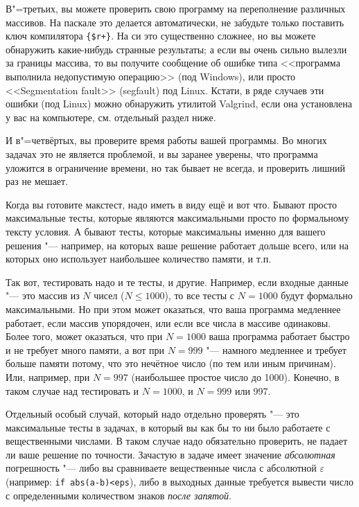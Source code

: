 В"=третьих, вы можете проверить свою программу на переполнение различных массивов. 
На паскале это делается автоматически, не забудьте только поставить ключ компилятора \verb`{$r+}`.
На си это существенно сложнее, но вы можете обнаружить какие-нибудь странные результаты;
а если вы очень сильно вылезли за границы массива, то вы получите сообщение об ошибке типа <<программа выполнила недопустимую операцию>> (под Windows),
или просто <<Segmentation fault>> (segfault) под Linux. 
Кстати, в ряде случаев эти ошибки (под Linux) можно обнаружить утилитой Valgrind, если она установлена у вас на компьютере, см. отдельный раздел ниже.

И в"=четвёртых, вы проверите время работы вашей программы. 
Во многих задачах это не является проблемой, и вы заранее уверены, что программа уложится в ограничение времени, 
но так бывает не всегда, и проверить лишний раз не мешает.

Когда вы готовите макстест, надо иметь в виду ещё и вот что. 
Бывают просто максимальные тесты, которые являются максимальными просто по формальному тексту условия.
А бывают тесты, которые максимальны именно для вашего решения "--- например, на которых ваше решение работает дольше всего,
или на которых оно использует наибольшее количество памяти, и т.п.

Так вот, тестировать надо и те тесты, и другие. 
Например, если входные данные "--- это массив из $N$ чисел ($N\leq 1000$), то все тесты с $N=1000$ будут формально максимальными.
Но при этом может оказаться, что ваша программа медленнее работает, если массив упорядочен, или если все числа в массиве одинаковы.
Более того, может оказаться, что при $N=1000$ ваша программа работает быстро и не требует много памяти, а вот при $N=999$ "--- 
намного медленнее и требует больше памяти потому, что это нечётное число (по тем или иным причинам). Или, например, при $N=997$ 
(наибольшее простое число до 1000). Конечно, в таком случае над тестировать и $N=1000$, и $N=999$ или 997.

Отдельный особый случай, который надо отдельно проверять "--- 
это максимальные тесты в задачах, в который вы как бы то ни было работаете с вещественными числами.
В таком случае надо обязательно проверить, не падает ли ваше решение по точности.
Зачастую в задаче имеет значение \textit{абсолютная} погрешность
"--- либо вы сравниваете вещественные числа с абсолютной $\varepsilon$ (например:
\verb`if abs(a-b)<eps`), либо в выходных данные требуется вывести число с определенными 
количеством знаков \textit{после запятой}. 

